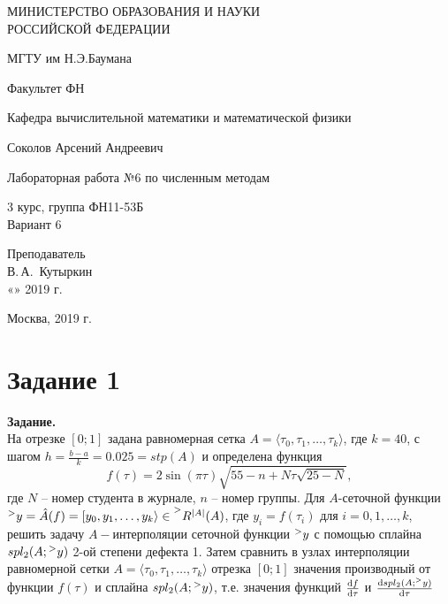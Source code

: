 \documentclass[14pt,a4paper]{scrartcl}
\begin{document}
	\begin{titlepage}
	\begin{center}
		\large
		МИНИСТЕРСТВО ОБРАЗОВАНИЯ И НАУКИ\\ РОССИЙСКОЙ ФЕДЕРАЦИИ
		
		\vspace{0.5cm}
		
		МГТУ им Н.Э.Баумана
		\vspace{0.25cm}
		
		Факультет ФН
		
		Кафедра вычислительной математики и математической физики
		\vfill
		
		
		Соколов Арсений Андреевич\\
		\vfill
		
		
		{\LARGE Лабораторная работа №6 по численным методам\\[2mm]
		}
		\bigskip
		
		3 курс, группа ФН11-53Б\\
		Вариант 6
	\end{center}
	\vfill
	
	\newlength{\ML}
	\hfill\begin{minipage}{0.4\textwidth}
		Преподаватель\\
		\underline{\hspace{3cm}} В.\,А.~Кутыркин\\
		«\underline{\hspace{0.7cm}}» \underline{\hspace{1.71cm}} 2019 г.
	\end{minipage}%
	\bigskip
	
	
	\vfill
	
	\begin{center}
		Москва, 2019 г.
	\end{center}
\end{titlepage}

\section*{Задание 1}
\textbf{Задание.}\\
На отрезке $[0;1]$ задана равномерная сетка $A = \langle \tau_0, \tau_1, \ldots, \tau_k\rangle$, где $k=40$, с шагом $h = \frac{b-a}{k} = 0.025 = stp(A)$ и определена функция $$f(\tau)=2 \sin (\pi \tau) \sqrt{55-n+N \tau \sqrt{25-N}},$$ где $N$ -- номер студента в журнале, $n$ -- номер группы. Для $A$-сеточной функции $\prescript{>}{}{y} = \hat{A}(f) = [y_0,y_1,\ldots,y_k\rangle \in \prescript{>}{}{R^{|A|}(A)}$, где $y_i=f(\tau_i)$ для $i=0,1,\ldots,k$, решить задачу $A-$интерполяции сеточной функции $\prescript{>}{}{y}$ с помощью сплайна $spl_2(A;\prescript{>}{}{y})$ 2-ой степени дефекта 1. Затем сравнить в узлах интерполяции равномерной сетки $A = \langle \tau_0, \tau_1, \ldots, \tau_k\rangle $ отрезка $[0;1]$ значения производный от функции $f(\tau)$ и сплайна $spl_2(A;\prescript{>}{}{y})$, т.е. значения функций $\dv{f}{\tau}$ и $\dv{spl_2(A;\prescript{>}{}{y})}{\tau}$
\end{document}
